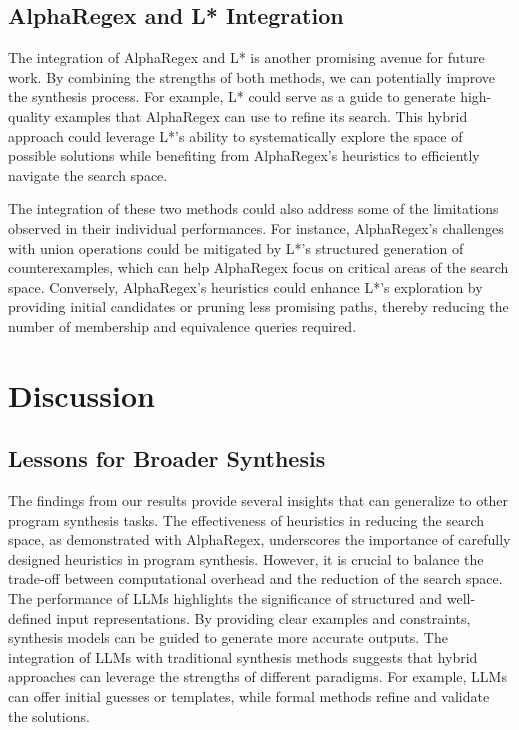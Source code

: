 \subsection{AlphaRegex and L* Integration}
\indent\indent The integration of AlphaRegex and L* is another promising avenue for future work. By combining the strengths of both methods, we can potentially improve the synthesis process. For example, L* could serve as a guide to generate high-quality examples that AlphaRegex can use to refine its search. This hybrid approach could leverage L*'s ability to systematically explore the space of possible solutions while benefiting from AlphaRegex's heuristics to efficiently navigate the search space.

\indent\indent The integration of these two methods could also address some of the limitations observed in their individual performances. For instance, AlphaRegex's challenges with union operations could be mitigated by L*'s structured generation of counterexamples, which can help AlphaRegex focus on critical areas of the search space. Conversely, AlphaRegex's heuristics could enhance L*'s exploration by providing initial candidates or pruning less promising paths, thereby reducing the number of membership and equivalence queries required.

\section{Discussion}

\subsection{Lessons for Broader Synthesis}
\indent\indent The findings from our results provide several insights that can generalize to other program synthesis tasks. The effectiveness of heuristics in reducing the search space, as demonstrated with AlphaRegex, underscores the importance of carefully designed heuristics in program synthesis. However, it is crucial to balance the trade-off between computational overhead and the reduction of the search space. The performance of LLMs highlights the significance of structured and well-defined input representations. By providing clear examples and constraints, synthesis models can be guided to generate more accurate outputs. The integration of LLMs with traditional synthesis methods suggests that hybrid approaches can leverage the strengths of different paradigms. For example, LLMs can offer initial guesses or templates, while formal methods refine and validate the solutions.

